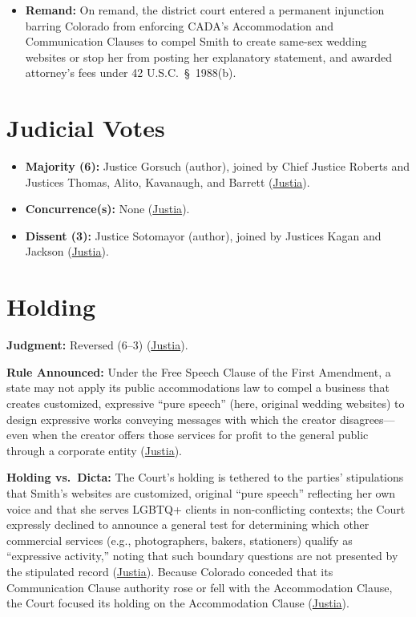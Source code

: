 \documentclass[12pt]{article}
\begin{document}
\begin{itemize}
  \item \textbf{Remand:} On remand, the district court entered a permanent injunction barring Colorado from enforcing CADA's Accommodation and Communication Clauses to compel Smith to create same-sex wedding websites or stop her from posting her explanatory statement, and awarded attorney's fees under 42 U.S.C.\ \S~1988(b).
\end{itemize}

\section{Judicial Votes}
\begin{itemize}
  \item \textbf{Majority (6):} Justice Gorsuch (author), joined by Chief Justice Roberts and Justices Thomas, Alito, Kavanaugh, and Barrett (\href{https://supreme.justia.com/cases/federal/us/600/21-476/}{Justia}).
  \item \textbf{Concurrence(s):} None (\href{https://supreme.justia.com/cases/federal/us/600/21-476/}{Justia}).
  \item \textbf{Dissent (3):} Justice Sotomayor (author), joined by Justices Kagan and Jackson (\href{https://supreme.justia.com/cases/federal/us/600/21-476/}{Justia}).
\end{itemize}

\section{Holding}
\textbf{Judgment:} Reversed (6--3) (\href{https://supreme.justia.com/cases/federal/us/600/21-476/}{Justia}).

\textbf{Rule Announced:} Under the Free Speech Clause of the First Amendment, a state may not apply its public accommodations law to compel a business that creates customized, expressive ``pure speech'' (here, original wedding websites) to design expressive works conveying messages with which the creator disagrees---even when the creator offers those services for profit to the general public through a corporate entity (\href{https://supreme.justia.com/cases/federal/us/600/21-476/}{Justia}).

\textbf{Holding vs.\ Dicta:} The Court's holding is tethered to the parties' stipulations that Smith's websites are customized, original ``pure speech'' reflecting her own voice and that she serves LGBTQ+ clients in non-conflicting contexts; the Court expressly declined to announce a general test for determining which other commercial services (e.g., photographers, bakers, stationers) qualify as ``expressive activity,'' noting that such boundary questions are not presented by the stipulated record (\href{https://supreme.justia.com/cases/federal/us/600/21-476/}{Justia}). Because Colorado conceded that its Communication Clause authority rose or fell with the Accommodation Clause, the Court focused its holding on the Accommodation Clause (\href{https://supreme.justia.com/cases/federal/us/600/21-476/}{Justia}).
\end{document}
